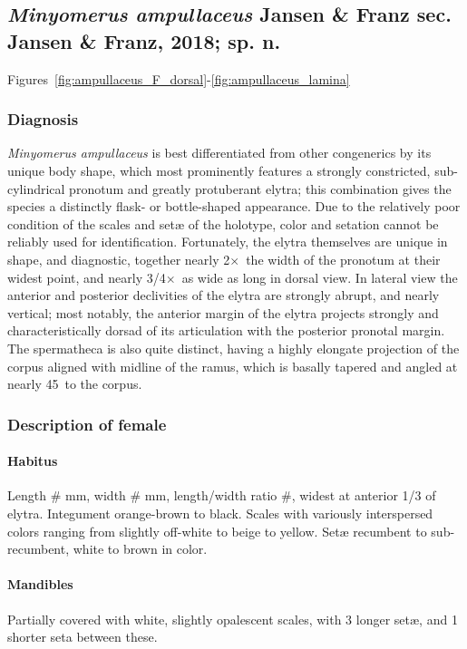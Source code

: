 \documentclass[fleqn,10pt,lineno]{wlpeerj} %
\newcommand{\td}{\textdegree~}
\newcommand{\x}{$\times$~}
\begin{document}
	\subsection*{\textit{Minyomerus ampullaceus} Jansen \& Franz sec. Jansen \& Franz, 2018; sp. n.}\label{ssec:amp}
		Figures~\ref{fig:ampullaceus_F_dorsal}-\ref{fig:ampullaceus_lamina}
		\subsubsection*{Diagnosis}
			\textit{Minyomerus ampullaceus} is best differentiated from other congenerics by its unique body shape, which most prominently features a strongly constricted, sub-cylindrical pronotum and greatly protuberant elytra; this combination gives the species a distinctly flask- or bottle-shaped appearance.
			Due to the relatively poor condition of the scales and set{\ae} of the holotype, color and setation cannot be reliably used for identification.
			Fortunately, the elytra themselves are unique in shape, and diagnostic, together nearly 2\x the width of the pronotum at their widest point, and nearly 3/4\x as wide as long in dorsal view.
			In lateral view the anterior and posterior declivities of the elytra are strongly abrupt, and nearly vertical; most notably, the anterior margin of the elytra projects strongly and characteristically dorsad of its articulation with the posterior pronotal margin.
			The spermatheca is also quite distinct, having a highly elongate projection of the corpus aligned with midline of the ramus, which is basally tapered and angled at nearly 45\td to the corpus.
		\subsubsection*{Description of female}
			\paragraph{Habitus}
				Length \# mm, width \# mm, length/width ratio \#, widest at anterior 1/3 of elytra.
				Integument orange-brown to black. 
				Scales with variously interspersed colors ranging from slightly off-white to beige to yellow. 
				Set{\ae} recumbent to sub-recumbent, white to brown in color.
			\paragraph{Mandibles}
				Partially covered with white, slightly opalescent scales, with 3 longer set{\ae}, and 1 shorter seta between these.
\end{document}
